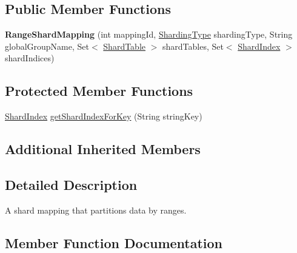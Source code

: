 \subsection*{Public Member Functions}
\begin{DoxyCompactItemize}
\item 
\mbox{\label{classcom_1_1mysql_1_1fabric_1_1_range_shard_mapping_a3bf9d36e3581ae45064487cf5fd357eb}} 
{\bfseries Range\+Shard\+Mapping} (int mapping\+Id, \mbox{\hyperlink{enumcom_1_1mysql_1_1fabric_1_1_sharding_type}{Sharding\+Type}} sharding\+Type, String global\+Group\+Name, Set$<$ \mbox{\hyperlink{classcom_1_1mysql_1_1fabric_1_1_shard_table}{Shard\+Table}} $>$ shard\+Tables, Set$<$ \mbox{\hyperlink{classcom_1_1mysql_1_1fabric_1_1_shard_index}{Shard\+Index}} $>$ shard\+Indices)
\end{DoxyCompactItemize}
\subsection*{Protected Member Functions}
\begin{DoxyCompactItemize}
\item 
\mbox{\hyperlink{classcom_1_1mysql_1_1fabric_1_1_shard_index}{Shard\+Index}} \mbox{\hyperlink{classcom_1_1mysql_1_1fabric_1_1_range_shard_mapping_a0195af3906593914326bfed4050eea72}{get\+Shard\+Index\+For\+Key}} (String string\+Key)
\end{DoxyCompactItemize}
\subsection*{Additional Inherited Members}


\subsection{Detailed Description}
A shard mapping that partitions data by ranges. 

\subsection{Member Function Documentation}
\mbox{\label{classcom_1_1mysql_1_1fabric_1_1_range_shard_mapping_a0195af3906593914326bfed4050eea72}} 
